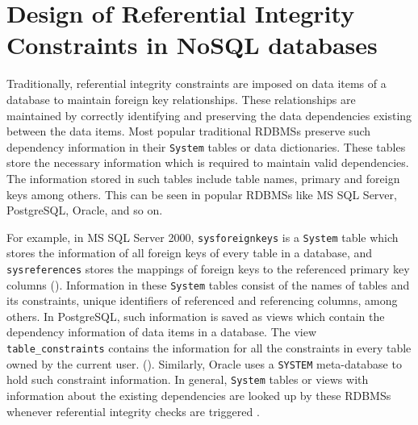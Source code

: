 \chapter{Design of Referential Integrity Constraints in NoSQL
databases}
\label{c:solutions}

Traditionally, referential
integrity constraints are imposed on data items of a database to maintain
foreign key relationships. These relationships are
 maintained by correctly identifying and preserving the data dependencies 
 existing between the data items.
Most popular traditional \acp{RDBMS}
preserve such dependency information in their \texttt{System} tables or data
dictionaries.  These tables store the necessary information  which is required
to maintain valid dependencies. The information stored in such tables include table
names,  primary and foreign keys among others.
This can be seen in popular \acp{RDBMS} like  MS SQL Server,  PostgreSQL,
Oracle, and so on.  

For example,  in MS SQL Server 2000, \texttt{sysforeignkeys}
is a \texttt{System} table which stores the information of all 
foreign keys of every table in a database, and \texttt{sysreferences}
stores the mappings of  foreign keys to the referenced primary key columns
().
Information in these \texttt{System} tables consist of  the
names of tables and its constraints,  unique identifiers of 
referenced and referencing columns,  among others. 
In PostgreSQL, such information is saved as views which contain the dependency
information of data items in a database.
The view \texttt{table\_constraints} contains the information for all the
constraints in every table owned by the current user. (\todo{\cite{}}). 
Similarly, Oracle uses a \texttt{SYSTEM} meta-database to hold such constraint
information.
 In general, \texttt{System} tables or views with information
about the existing dependencies  are looked up by these \acp{RDBMS} whenever
referential integrity checks are triggered \citep{sys:msdn}.


